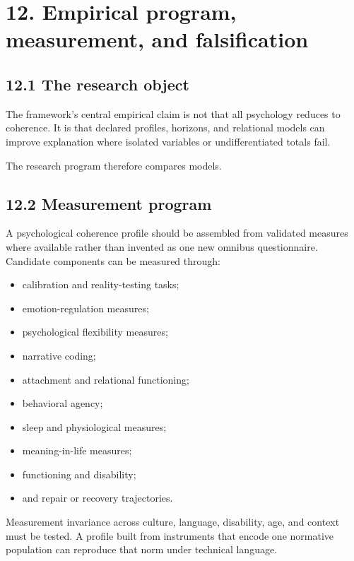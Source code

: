 \documentclass[
  11pt,
]{article}
\providecommand{\tightlist}{%
  \setlength{\itemsep}{0pt}\setlength{\parskip}{0pt}}
\begin{document}
\section{12. Empirical program, measurement, and
falsification}\label{empirical-program-measurement-and-falsification}

\subsection{12.1 The research object}\label{the-research-object}

The framework's central empirical claim is not that all psychology
reduces to coherence. It is that declared profiles, horizons, and
relational models can improve explanation where isolated variables or
undifferentiated totals fail.

The research program therefore compares models.

\subsection{12.2 Measurement program}\label{measurement-program}

A psychological coherence profile should be assembled from validated
measures where available rather than invented as one new omnibus
questionnaire. Candidate components can be measured through:

\begin{itemize}
\tightlist
\item
  calibration and reality-testing tasks;
\item
  emotion-regulation measures;
\item
  psychological flexibility measures;
\item
  narrative coding;
\item
  attachment and relational functioning;
\item
  behavioral agency;
\item
  sleep and physiological measures;
\item
  meaning-in-life measures;
\item
  functioning and disability;
\item
  and repair or recovery trajectories.
\end{itemize}

Measurement invariance across culture, language, disability, age, and
context must be tested. A profile built from instruments that encode one
normative population can reproduce that norm under technical language.
\end{document}
